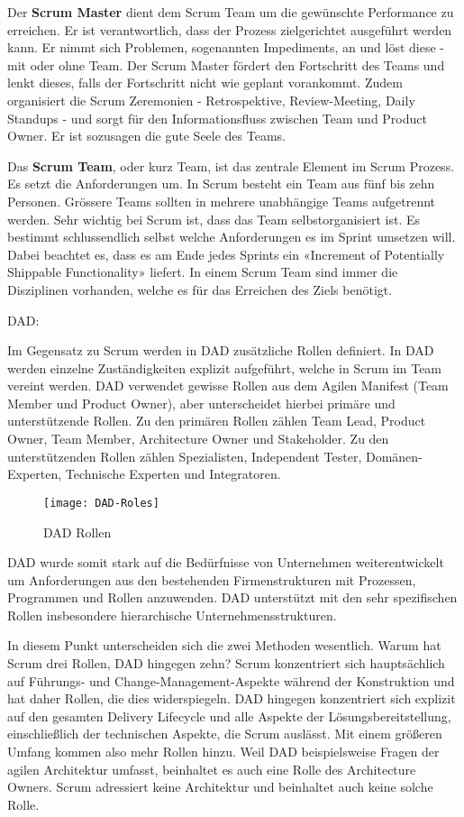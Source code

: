 Der \textbf{Scrum Master} dient dem Scrum Team um die gewünschte Performance zu erreichen. Er ist verantwortlich, dass der Prozess zielgerichtet ausgeführt werden kann. Er nimmt sich Problemen, sogenannten Impediments, an und löst diese - mit oder ohne Team. Der Scrum Master fördert den Fortschritt des Teams und lenkt dieses, falls der Fortschritt nicht wie geplant vorankommt. Zudem organisiert die Scrum Zeremonien - Retrospektive, Review-Meeting, Daily Standups - und sorgt für den Informationsfluss zwischen Team und Product Owner. Er ist sozusagen die gute Seele des Teams. \medskip

Das \textbf{Scrum Team}, oder kurz Team, ist das zentrale Element im Scrum Prozess. Es setzt die Anforderungen um. In Scrum besteht ein Team aus fünf bis zehn Personen. Grössere Teams sollten in mehrere unabhängige Teams aufgetrennt werden. Sehr wichtig bei Scrum ist, dass das Team selbstorganisiert ist. Es bestimmt schlussendlich selbst welche Anforderungen es im Sprint umsetzen will. Dabei beachtet es, dass es am Ende jedes Sprints ein «Increment of  Potentially Shippable Functionality» liefert. In einem Scrum Team sind immer die Disziplinen vorhanden, welche es für das Erreichen des Ziels benötigt.
\bigskip

{\Large DAD:} \medskip

Im Gegensatz zu Scrum werden in DAD zusätzliche Rollen definiert. In DAD werden einzelne Zuständigkeiten explizit aufgeführt, welche in Scrum im Team vereint werden. DAD verwendet gewisse Rollen aus dem Agilen Manifest (Team Member und Product Owner), aber unterscheidet hierbei primäre und unterstützende Rollen. Zu den primären Rollen zählen Team Lead, Product Owner, Team Member, Architecture Owner und Stakeholder. Zu den unterstützenden Rollen zählen Spezialisten, Independent Tester, Domänen-Experten, Technische Experten und Integratoren.
\begin{figure}[H]
	\centering
	\texttt{[image: DAD-Roles]}
	\caption{DAD Rollen}
	\label{fig:dadrollen}
\end{figure}

DAD wurde somit stark auf die Bedürfnisse von Unternehmen weiterentwickelt um Anforderungen aus den bestehenden Firmenstrukturen mit Prozessen, Programmen und Rollen anzuwenden. DAD unterstützt mit den sehr spezifischen Rollen insbesondere hierarchische Unternehmensstrukturen.
\bigskip


In diesem Punkt unterscheiden sich die zwei Methoden wesentlich. Warum hat Scrum drei Rollen, DAD hingegen zehn? Scrum konzentriert sich hauptsächlich auf Führungs- und Change-Management-Aspekte während der Konstruktion und hat daher Rollen, die dies widerspiegeln. DAD hingegen konzentriert sich explizit auf den gesamten Delivery Lifecycle und alle Aspekte der Lösungsbereitstellung, einschließlich der technischen Aspekte, die Scrum auslässt. Mit einem größeren Umfang kommen also mehr Rollen hinzu. Weil DAD beispielsweise Fragen der agilen Architektur umfasst, beinhaltet es auch eine Rolle des Architecture Owners. Scrum adressiert keine Architektur und beinhaltet auch keine solche Rolle.

